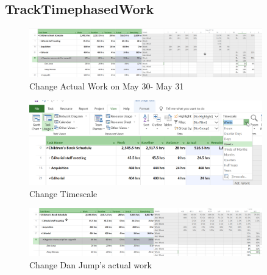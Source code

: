 \documentclass[runningheads]{llncs}
\begin{document}
\subsection*{TrackTimephasedWork}
\begin{figure}[H]
    \centering
    \includegraphics[width=0.9\textwidth]{./image/t6f1}
    \caption{Change Actual Work on May 30- May 31}
\end{figure}
\begin{figure}[H]
    \centering
    \includegraphics[width=0.9\textwidth]{./image/t6f2}
    \caption{Change Timescale}
\end{figure}
\begin{figure}[H]
    \centering
    \includegraphics[width=0.9\textwidth]{./image/t6f3}
    \caption{Change Dan Jump's actual work}
\end{figure}
\end{document}
